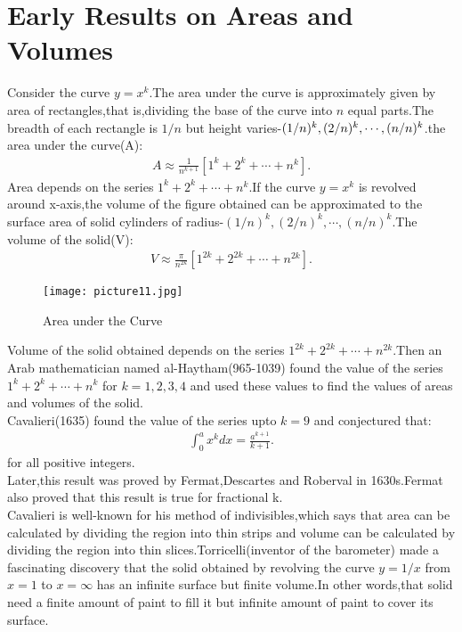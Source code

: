 \documentclass[a4paper,reqno,11pt]{book}
\theoremstyle{plain}%
\theoremstyle{definition}
\begin{document}
\section{Early Results on Areas and Volumes}
\noindent Consider the curve $y=x^k$.The area under the curve is approximately given by area of rectangles,that is,dividing the base of the curve into $n$ equal parts.The breadth of each rectangle is $1/n$ but height varies-$(1/n)^k,(2/n)^k,\cdots\\,(n/n)^k$.the area under the curve(A):
\begin{eqnarray*}
    A\approx\frac{1}{n^{k+1}}[1^k+2^k+\cdots+n^k].
\end{eqnarray*}
Area depends on the series $1^k+2^k+\cdots+n^k$.If the curve $y=x^k$ is revolved around x-axis,the volume of the figure obtained can be approximated to the surface area of solid cylinders of radius-$(1/n)^k,(2/n)^k,\cdots,(n/n)^k$.The volume of the solid(V):
\begin{eqnarray*}
    V\approx\frac{\pi}{n^{2k}}[1^{2k}+2^{2k}+\cdots+n^{2k}].
\end{eqnarray*}
\begin{figure}[h]
    \centering
    \texttt{[image: picture11.jpg]}
    \caption{Area under the Curve}
    \label{fig:picture11}
\end{figure}
Volume of the solid obtained depends on the series $1^{2k}+2^{2k}+\cdots+n^{2k}$.Then an Arab mathematician named al-Haytham(965-1039) found the value of the series $1^k+2^k+\cdots+n^k$ for $k=1,2,3,4$ and used these values to find the values of areas and volumes of the solid.\\
\indent Cavalieri(1635) found the value of the series upto $k=9$ and conjectured that:
\begin{eqnarray*}
    \int_{0}^{a}x^kdx=\frac{a^{k+1}}{k+1}.
\end{eqnarray*}
for all positive integers.\\
Later,this result was proved by Fermat,Descartes and Roberval in 1630s.Fermat also proved that this result is true for fractional k.\\
\indent Cavalieri is well-known for his method of indivisibles,which says that area can be calculated by dividing the region into thin strips and volume can be calculated by dividing the region into thin slices.Torricelli(inventor of the barometer) made a fascinating discovery that the solid obtained by revolving the curve $y=1/x$ from $x=1$ to $x=\infty$ has an infinite surface but finite volume.In other words,that solid need a finite amount of paint to fill it but infinite amount of paint to cover its surface.
\end{document}
